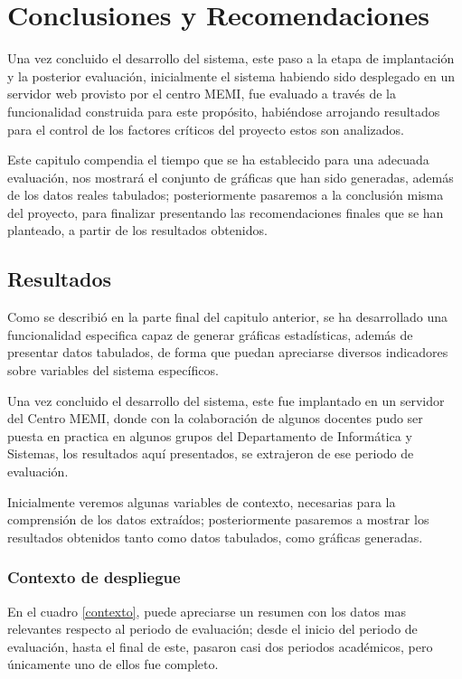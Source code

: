 \chapter{Conclusiones y Recomendaciones}

Una vez concluido el desarrollo del sistema, este paso a la etapa de
implantación y la posterior evaluación, inicialmente el sistema habiendo sido
desplegado en un servidor web provisto por el centro MEMI, fue evaluado a través
de la funcionalidad construida para este propósito, habiéndose arrojando
resultados para el control de los factores críticos del proyecto estos son
analizados.

Este capitulo compendia el tiempo que se ha establecido para una adecuada
evaluación, nos mostrará el conjunto de gráficas que han sido generadas, además
de los datos reales tabulados; posteriormente pasaremos a la conclusión misma
del proyecto, para finalizar presentando las recomendaciones finales que se han
planteado, a partir de los resultados obtenidos.

\section{Resultados}
Como se describió en la parte final del capitulo anterior, se ha desarrollado
una funcionalidad especifica capaz de generar gráficas estadísticas, además de
presentar datos tabulados, de forma que puedan apreciarse diversos indicadores
sobre variables del sistema específicos.

Una vez concluido el desarrollo del sistema, este fue implantado en un servidor
del Centro MEMI, donde con la colaboración de algunos docentes pudo ser puesta
en practica en algunos grupos del Departamento de Informática y Sistemas, los
resultados aquí presentados, se extrajeron de ese periodo  de evaluación.

Inicialmente veremos algunas variables de contexto, necesarias para la
comprensión de los datos extraídos; posteriormente pasaremos a mostrar los
resultados obtenidos tanto como datos tabulados, como gráficas generadas.

\subsection{Contexto de despliegue}
En el cuadro \ref{contexto}, puede apreciarse un resumen con los datos mas
relevantes respecto al periodo de evaluación; desde el inicio del periodo de
evaluación, hasta el final de este, pasaron casi dos periodos académicos, pero
únicamente uno de ellos fue completo.

